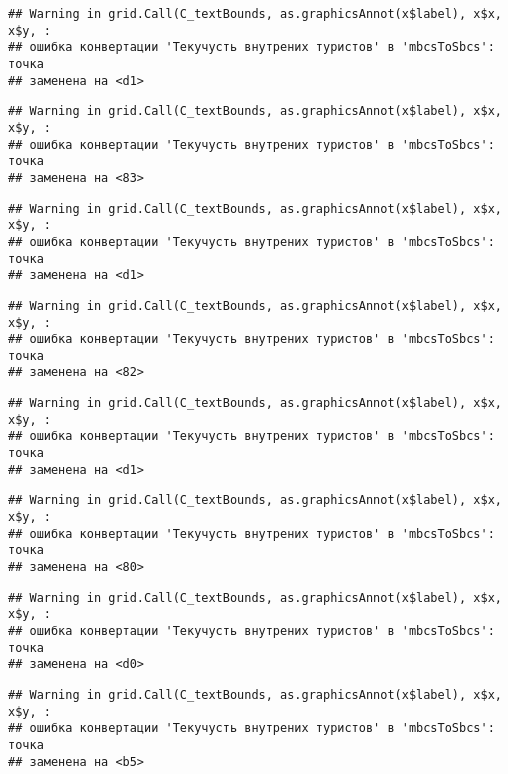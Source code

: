 \documentclass[
]{article}
\begin{document}
\begin{verbatim}
## Warning in grid.Call(C_textBounds, as.graphicsAnnot(x$label), x$x, x$y, :
## ошибка конвертации 'Текучусть внутрених туристов' в 'mbcsToSbcs': точка
## заменена на <d1>
\end{verbatim}

\begin{verbatim}
## Warning in grid.Call(C_textBounds, as.graphicsAnnot(x$label), x$x, x$y, :
## ошибка конвертации 'Текучусть внутрених туристов' в 'mbcsToSbcs': точка
## заменена на <83>
\end{verbatim}

\begin{verbatim}
## Warning in grid.Call(C_textBounds, as.graphicsAnnot(x$label), x$x, x$y, :
## ошибка конвертации 'Текучусть внутрених туристов' в 'mbcsToSbcs': точка
## заменена на <d1>
\end{verbatim}

\begin{verbatim}
## Warning in grid.Call(C_textBounds, as.graphicsAnnot(x$label), x$x, x$y, :
## ошибка конвертации 'Текучусть внутрених туристов' в 'mbcsToSbcs': точка
## заменена на <82>
\end{verbatim}

\begin{verbatim}
## Warning in grid.Call(C_textBounds, as.graphicsAnnot(x$label), x$x, x$y, :
## ошибка конвертации 'Текучусть внутрених туристов' в 'mbcsToSbcs': точка
## заменена на <d1>
\end{verbatim}

\begin{verbatim}
## Warning in grid.Call(C_textBounds, as.graphicsAnnot(x$label), x$x, x$y, :
## ошибка конвертации 'Текучусть внутрених туристов' в 'mbcsToSbcs': точка
## заменена на <80>
\end{verbatim}

\begin{verbatim}
## Warning in grid.Call(C_textBounds, as.graphicsAnnot(x$label), x$x, x$y, :
## ошибка конвертации 'Текучусть внутрених туристов' в 'mbcsToSbcs': точка
## заменена на <d0>
\end{verbatim}

\begin{verbatim}
## Warning in grid.Call(C_textBounds, as.graphicsAnnot(x$label), x$x, x$y, :
## ошибка конвертации 'Текучусть внутрених туристов' в 'mbcsToSbcs': точка
## заменена на <b5>
\end{verbatim}
\end{document}
